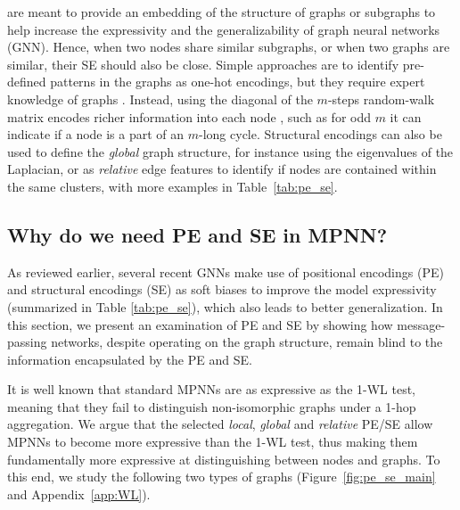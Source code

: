 \documentclass{article}
\begin{document}
 are meant to provide an embedding of the structure of graphs or subgraphs to help increase the expressivity and the generalizability of graph neural networks (GNN). Hence, when two nodes share similar subgraphs, or when two graphs are similar, their SE should also be close. Simple approaches are to identify pre-defined patterns in the graphs as one-hot encodings, but they require expert knowledge of graphs \cite{bouritsas2022improving_GSN, bodnar2021weisfeiler_CIN}. Instead, using the diagonal of the $m$-steps random-walk matrix encodes richer information into each node \cite{dwivedi2022LPE}, such as for odd $m$ it can indicate if a node is a part of an $m$-long cycle. Structural encodings can also be used to define the \textit{global} graph structure, for instance using the eigenvalues of the Laplacian, or as \textit{relative} edge features to identify if nodes are contained within the same clusters, with more examples in Table~\ref{tab:pe_se}.


\subsection{Why do we need PE and SE in MPNN?}
\label{sec:need_pe_se}
As reviewed earlier, several recent GNNs make use of positional encodings (PE) and structural encodings (SE) as soft biases to improve the model expressivity (summarized in Table \ref{tab:pe_se}), which also leads to better generalization. In this section, we present an examination of PE and SE by showing how message-passing networks, despite operating on the graph structure, remain blind to the information encapsulated by the PE and SE.

It is well known that standard MPNNs are as expressive as the 1-WL test, meaning that they fail to distinguish non-isomorphic graphs under a 1-hop aggregation. We argue that the selected \textit{local}, \textit{global} and \textit{relative} PE/SE allow MPNNs to become more expressive than the 1-WL test, thus making them fundamentally more expressive at distinguishing between nodes and graphs.
To this end, we study the following two types of graphs (Figure~\ref{fig:pe_se_main} and Appendix~\ref{app:WL}).

\end{document}
